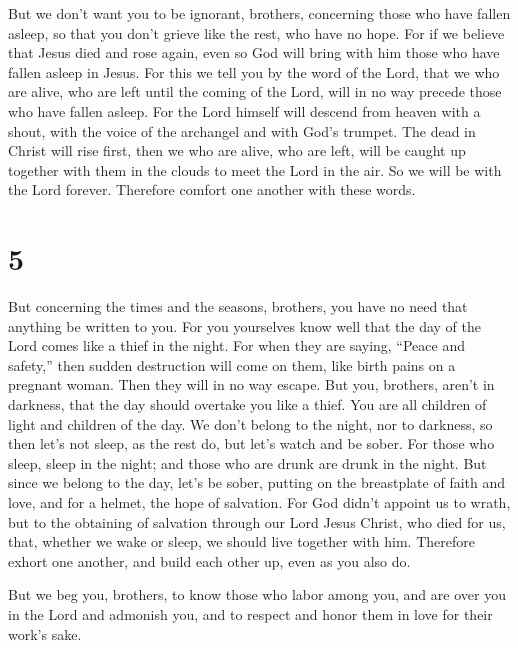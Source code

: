  But we don't want you to be ignorant, brothers,
concerning those who have fallen asleep, so that you don't grieve like
the rest, who have no hope.  For if we believe that Jesus
died and rose again, even so God will bring with him those who have
fallen asleep in Jesus.  For this we tell you by the word
of the Lord, that we who are alive, who are left until the coming of the
Lord, will in no way precede those who have fallen asleep.
 For the Lord himself will descend from heaven with a
shout, with the voice of the archangel and with God's trumpet. The dead
in Christ will rise first,  then we who are alive, who
are left, will be caught up together with them in the clouds to meet the
Lord in the air. So we will be with the Lord forever. 
Therefore comfort one another with these words.

\hypertarget{section-4}{%
\section{5}\label{section-4}}

 But concerning the times and the seasons, brothers, you
have no need that anything be written to you.  For you
yourselves know well that the day of the Lord comes like a thief in the
night.  For when they are saying, ``Peace and safety,''
then sudden destruction will come on them, like birth pains on a
pregnant woman. Then they will in no way escape.  But you,
brothers, aren't in darkness, that the day should overtake you like a
thief.  You are all children of light and children of the
day. We don't belong to the night, nor to darkness,  so
then let's not sleep, as the rest do, but let's watch and be sober.
 For those who sleep, sleep in the night; and those who
are drunk are drunk in the night.  But since we belong to
the day, let's be sober, putting on the breastplate of faith and love,
and for a helmet, the hope of salvation.  For God didn't
appoint us to wrath, but to the obtaining of salvation through our Lord
Jesus Christ,  who died for us, that, whether we wake or
sleep, we should live together with him.  Therefore
exhort one another, and build each other up, even as you also do.

 But we beg you, brothers, to know those who labor among
you, and are over you in the Lord and admonish you,  and
to respect and honor them in love for their work's sake.


